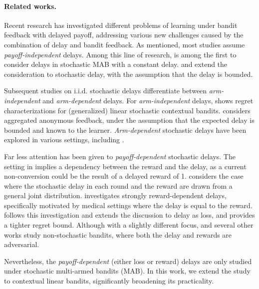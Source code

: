\paragraph{Related works.} 
Recent research has investigated different problems of learning under bandit feedback with delayed payoff, addressing various new challenges caused by the combination of delay and bandit feedback. As mentioned, most studies assume {\it payoff-independent} delays. Among this line of research, \citet{Dudk2011EfficientOL} is among the first to consider delays in stochastic MAB with a constant delay. \citet{mandel2015queue} and \citet{joulani2013online} extend the consideration to stochastic delay, with the assumption that the delay is bounded.

Subsequent studies on  i.i.d. stochastic delays differentiate between {\it arm-independent} and {\it arm-dependent} delays. For {\it arm-independent} delays, \citet{zhou2019learning,vernade2020linear,blanchet2024delay-contextual-linear} shows regret characterizations for (generalized) linear stochastic contextual bandits.
\citet{pike2018bandits} considers  aggregated anonymous feedback, under the assumption that the expected delay is bounded and known to the learner. {\it Arm-dependent} stochastic delays have been explored in various settings, including \citet{gael2020stochastic,arya2020randomized,lancewicki2021stochastic}.


Far less attention has been given to {\it payoff-dependent} stochastic delays. The setting in
\citet{vernade:hal-01545667} implies a dependency between the reward and the delay, as a current non-conversion could be the result of a delayed reward of 1.  \citet{lancewicki2021stochastic} considers the case where the stochastic delay in each round and the reward are drawn from a general joint distribution. 
\citet{tang2024stochastic} investigates strongly reward-dependent delays, specifically motivated by medical settings where the delay is equal to the reward. \citet{ schlisselberg2024delay} follows this investigation and extends the discussion to  delay as loss, and provides a tighter regret bound. Although with a slightly different focus, \citet{thune2019nonstochastic, zimmert2020optimal,gyorgy2021adapting, van2022nonstochastic,van2023unified} and several other works study non-stochastic bandits, where  both the delay and rewards are adversarial. 

Nevertheless, the {\it payoff-dependent} (either loss or reward) delays are only studied under stochastic multi-armed bandits (MAB).  In this work, we extend the study to contextual linear bandits, significantly broadening its practicality.

